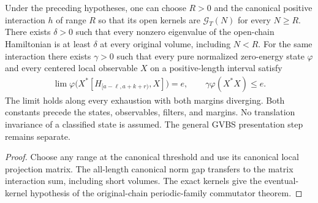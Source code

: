 \begin{theorem}
    \label{thm:periodic_family_constructed_finite_quasi_local_gap}
    \leanok
    Under the preceding hypotheses, one can choose $R>0$ and the
    canonical positive interaction $h$ of range $R$ so that its open
    kernels are $\mathcal G_T(N)$ for every $N\ge R$.
    There exists $\delta>0$ such that every nonzero eigenvalue of the
    open-chain Hamiltonian is at least $\delta$ at every original volume,
    including $N<R$.
    For the same interaction there exists $\gamma>0$ such that every
    pure normalized zero-energy state $\varphi$ and every centered
    local observable $X$ on a positive-length interval satisfy
    \begin{align}
        \lim\varphi\bigl(X^*[H_{[a-\ell,a+k+r)},X]\bigr)=e,
        \qquad \gamma\varphi(X^*X)\le e.
    \end{align}
    The limit holds along every exhaustion with both margins diverging.
    Both constants precede the states, observables, filters, and margins.
    No translation invariance of a classified state is assumed.
    The general GVBS presentation step remains separate.
\end{theorem}
\begin{proof}\leanok
    Choose any range at the canonical threshold and use its canonical
    local projection matrix. The all-length canonical norm gap transfers
    to the matrix interaction sum, including short volumes. The exact
    kernels give the eventual-kernel hypothesis of the original-chain
    periodic-family commutator theorem.
\end{proof}

